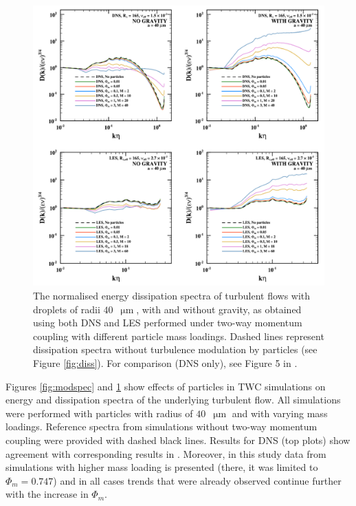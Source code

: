 \documentclass{pracamgren}
\begin{document}
\begin{figure}[h]
\centering
\includegraphics[width=13.5cm]{figures/2-04_moddiss.pdf}
\caption{
The normalised energy dissipation spectra of turbulent flows with droplets of radii $40$~$\upmu\text{m}$, with and without gravity, as obtained using both DNS and LES performed under two-way momentum coupling with different particle mass loadings.
Dashed lines represent dissipation spectra without turbulence modulation by particles (see Figure \ref{fig:diss}).
For comparison (DNS only), see Figure 5 in \textcite{Rosa2020}.
}
\label{fig:moddiss}
\end{figure}

Figures \ref{fig:modspec} and \ref{fig:moddiss} show effects of particles in TWC simulations on energy and dissipation spectra of the underlying turbulent flow.
All simulations were performed with particles with radius of $40$~$\upmu\text{m}$ and with varying mass loadings.
Reference spectra from simulations without two-way momentum coupling were provided with dashed black lines.
Results for DNS (top plots) show agreement with corresponding results in \textcite[Figures 4 and 5 therein]{Rosa2020}.
Moreover, in this study data from simulations with higher mass loading is presented (there, it was limited to $\Phi_m = 0.747$) and in all cases trends that were already observed continue further with the increase in $\Phi_m$.
\end{document}
